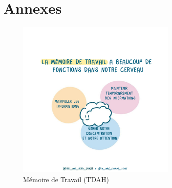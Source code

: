 \documentclass[11pt,a4paper]{report}
\begin{document}
\chapter*{Annexes}

\begin{figure}[h]
    \centering
    \includegraphics[width=0.7\textwidth]{images/ADHD-Working-Memory.png}
    \caption{Mémoire de Travail (TDAH)}
    \label{fig:tdah}
\end{figure}
\end{document}
